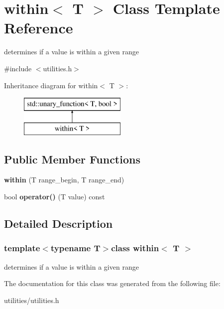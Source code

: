 \hypertarget{classwithin}{\section{within$<$ T $>$ Class Template Reference}
\label{classwithin}
}


determines if a value is within a given range  




{\ttfamily \#include $<$utilities.\-h$>$}

Inheritance diagram for within$<$ T $>$\-:\begin{figure}[H]
\begin{center}
\leavevmode
\includegraphics[height=2.000000cm]{classwithin}
\end{center}
\end{figure}
\subsection*{Public Member Functions}
\begin{DoxyCompactItemize}
\item 
\hypertarget{classwithin_ac461f80eef6cbe70a69729fd5b99f751}{{\bfseries within} (T range\-\_\-begin, T range\-\_\-end)}\label{classwithin_ac461f80eef6cbe70a69729fd5b99f751}

\item 
\hypertarget{classwithin_aaab5ecca0235613f499bc5e607d23cbd}{bool {\bfseries operator()} (T value) const }\label{classwithin_aaab5ecca0235613f499bc5e607d23cbd}

\end{DoxyCompactItemize}


\subsection{Detailed Description}
\subsubsection*{template$<$typename T$>$class within$<$ T $>$}

determines if a value is within a given range 

The documentation for this class was generated from the following file\-:\begin{DoxyCompactItemize}
\item 
utilities/utilities.\-h\end{DoxyCompactItemize}
